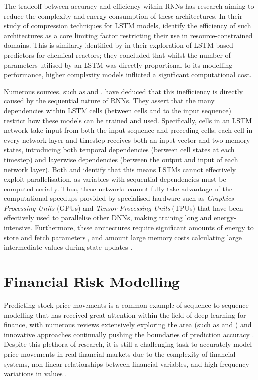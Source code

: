\documentclass[a4paper, 11pt]{report}
\begin{document}
    The tradeoff between accuracy and efficiency within RNNs has research aiming to reduce the complexity and energy consumption of these architectures. In their study of compression techniques for LSTM models, \citet{wang-2018} identify the efficiency of such architectures as a core limiting factor restricting their use in resource-constrained domains. This is similarly identified by \citet{zarzycki-2021} in their exploration of LSTM-based predictors for chemical reactors; they concluded that whilst the number of parameters utilised by an LSTM was directly proportional to its modelling performance, higher complexity models inflicted a significant computational cost. 

    Numerous sources, such as \citet{cao-2017} and \citet{feliz-2021}, have deduced that this inefficiency is directly caused by the sequential nature of RNNs. They assert that the many dependencies within LSTM cells (between cells and to the input sequence) restrict how these models can be trained and used. Specifically, cells in an LSTM network take input from both the input sequence and preceding cells; each cell in every network layer and timestep receives both an input vector and two memory states, introducing both temporal dependencies (between cell states at each timestep) and layerwise dependencies (between the output and input of each network layer). Both \citet{cao-2017} and \citet{feliz-2021} identify that this means LSTMs cannot effectively exploit parallelisation, as variables with sequential dependencies must be computed serially. Thus, these networks cannot fully take advantage of the computational speedups provided by specialised hardware such as \emph{Graphics Processing Units} (GPUs) and \emph{Tensor Processing Units} (TPUs) that have been effectively used to parallelise other DNNs, making training long and energy-intensive. Furthermore, these arcitectures require significant amounts of energy to store and fetch parameters \citep{feliz-2021}, and amount large memory costs calculating large intermediate values during state updates \citep{cao-2017}.


    \section{Financial Risk Modelling}

    Predicting stock price movements is a common example of sequence-to-sequence modelling that has received great attention within the field of deep learning for finance, with numerous reviews extensively exploring the area (such as \citet{sezer-2019} and \citet{jiang-2021}) and innovative approaches continually pushing the boundaries of prediction accuracy \citep{darapaneni-2022}. Despite this plethora of research, it is still a challenging task to accurately model price movements in real financial markets due to the complexity of financial systems, non-linear relationships between financial variables, and high-frequency variations in values \citep{timmermann-2004}.
\end{document}
